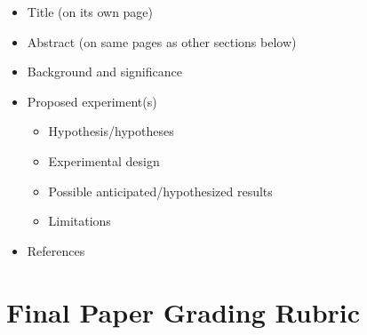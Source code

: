 \documentclass[
  letterpaper,
  DIV=11,
  numbers=noendperiod]{scrreprt}
\providecommand{\tightlist}{%
  \setlength{\itemsep}{0pt}\setlength{\parskip}{0pt}}\usepackage{longtable,booktabs,array}
\begin{document}
\begin{itemize}
\tightlist
\item
  Title (on its own page)
\item
  Abstract (on same pages as other sections below)
\item
  Background and significance
\item
  Proposed experiment(s)

  \begin{itemize}
  \tightlist
  \item
    Hypothesis/hypotheses
  \item
    Experimental design
  \item
    Possible anticipated/hypothesized results
  \item
    Limitations
  \end{itemize}
\item
  References
\end{itemize}

\hypertarget{final-paper-grading-rubric}{%
\section*{Final Paper Grading Rubric}\label{final-paper-grading-rubric}}

\end{document}

